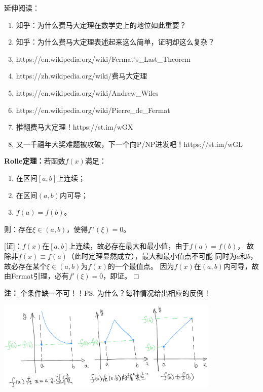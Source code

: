 \begin{shaded}
	延伸阅读：
	\begin{enumerate}[1.]
	  \setlength{\itemindent}{1cm}
	  \item 知乎：为什么费马大定理在数学史上的地位如此重要？
	  \item 知乎：为什么费马大定理表述起来这么简单，证明却这么复杂？
	  \item https://en.wikipedia.org/wiki/Fermat's\_Last\_Theorem
	  \item https://zh.wikipedia.org/wiki/费马大定理
	  \item https://en.wikipedia.org/wiki/Andrew\_Wiles
	  \item https://en.wikipedia.org/wiki/Pierre\_de\_Fermat
	  \item 推翻费马大定理！https://st.im/wGX
	  \item 又一千禧年大奖难题被攻破，下一个向P/NP进发吧！https://st.im/wGL
	\end{enumerate}
\end{shaded}

\begin{thx}
	{\bf Rolle定理：}若函数$f(x)$满足：
	\begin{enumerate}[(1)]
	  \setlength{\itemindent}{1cm}
	  \item 在区间$[a,b]$上连续；
	  \item 在区间$(a,b)$内可导；
	  \item $f(a)=f(b)$。
	\end{enumerate}
	则：存在$\xi\in(a,b)$，使得$f\,'(\xi)=0$。
\end{thx}

[证]：$f(x)$在$[a,b]$上连续，故必存在最大和最小值，由于$f(a)=f(b)$，
故除非$f(x)\equiv f(a)$（此时定理显然成立），最大和最小值点不可能
同时为$a$和$b$，故必存在某个$\xi\in(a,b)$为$f(x)$的一个最值点。
因为$f(x)$在$(a,b)$内可导，故由Fermat引理，必有$f'(\xi)=0$，即证。\hfill$\Box$

{\bf 注：}{\b 三个条件缺一不可！！}\ps{为什么？每种情况给出相应的反例！}

\begin{center}
	\includegraphics[width=0.8\textwidth]{./images/ch3/antiRolle.jpg}
\end{center}


